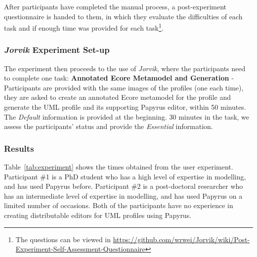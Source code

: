 After participants have completed the manual process, a post-experiment questionnaire is handed to them, in which they evaluate the difficulties of each task and if enough time was provided for each task\footnote{The questions can be viewed in \url{https://github.com/wrwei/Jorvik/wiki/Post-Experiment-Self-Assessment-Questionnaire}}.

\subsubsection{\textit{Jorvik} Experiment Set-up}
The experiment then proceeds to the use of \textit{Jorvik}, where the participants need to complete one task:
\textbf{Annotated Ecore Metamodel and Generation} - Participants are provided with the same images of the profiles (one each time), they are asked to create an annotated Ecore metamodel for the profile and generate the UML profile and its supporting Papyrus editor, within 50 minutes.
The \textit{Default} information is provided at the beginning. 	
30 minutes in the task, we assess the participants' status and provide the \textit{Essential} information.

\subsubsection{Results}
Table~\ref{tab:experiment} shows the times obtained from the user experiment.
Participant \#1 is a PhD student who has a high level of expertise in modelling, and has used Papyrus before.
Participant \#2 is a post-doctoral researcher who has an intermediate level of expertise in modelling, and has used Papyrus on a limited number of occasions. 
Both of the participants have no experience in creating distributable editors for UML profiles using Papyrus.

